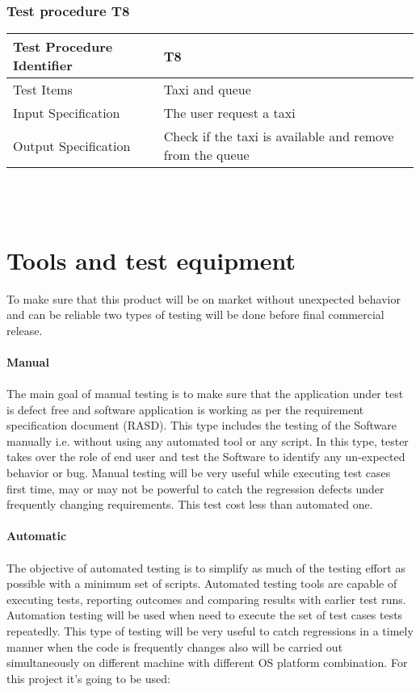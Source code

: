 \documentclass[12pt, oneside]{book}   	%
\begin{document}
\subsection{Test procedure T8}
\begin{tabular}{|l|l|}
\hline
Test Procedure Identifier & T8\\
\hline
Test Items & Taxi and queue\\
\hline
Input Specification & The user request a taxi\\
\hline
Output Specification & Check if the taxi is available and remove from the queue\\
\hline
\end{tabular}
\\
\\
\chapter{Tools and test equipment }
To make sure that this product will be on market without unexpected behavior and can be reliable two types of testing will be done before final commercial release.
\\
\\
\textbf{Manual}
\\
\\
The main goal of manual testing is to make sure that the application under test is defect free and software application is working as per the requirement specification document (RASD). This type includes the testing of the Software manually i.e. without using any automated tool or any script. In this type, tester takes over the role of end user and test the Software to identify any un-expected behavior or bug. Manual testing will be very useful while executing test cases first time, may or may not be powerful to catch the regression defects under frequently changing requirements. This test cost less than automated one.
\\
\\
\textbf{Automatic}
\\
\\
The objective of automated testing is to simplify as much of the testing effort as possible with a minimum set of scripts. Automated testing tools are capable of executing tests, reporting outcomes and comparing results with earlier test runs. Automation testing will be used when need to execute the set of test cases tests repeatedly. This type of testing will be very useful to catch regressions in a timely manner when the code is frequently changes also will be carried out simultaneously on different machine with different OS platform combination. For this project it's going to be used:
\end{document}
